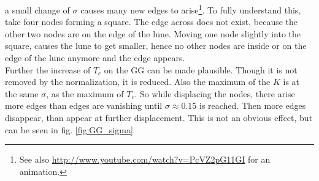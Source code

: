     a small change of \(\sigma\) causes many new edges to arise\footnote{See also \url{http://www.youtube.com/watch?v=PcVZ2pG11GI} for an animation.}.
    To fully understand this, take four nodes forming a square. The edge
    across does not exist, because the other two nodes are on the edge
    of the lune. Moving one node slightly into the square, causes the lune
    to get smaller, hence no other nodes are inside or on the edge of
    the lune anymore and the edge appears.\\
    Further the increase of \(T_c\) on the GG can be made plausible.
    Though it is not removed by the normalization, it is reduced. Also
    the maximum of the \(K\) is at the same \(\sigma\), as the maximum
    of \(T_c\). So while displacing the nodes, there arise more edges
    than edges are vanishing until \(\sigma \approx 0.15\) is reached.
    Then more edges disappear, than appear at further displacement. This
    is not an obvious effect, but can be seen in fig. \ref{fig:GG_sigma}

